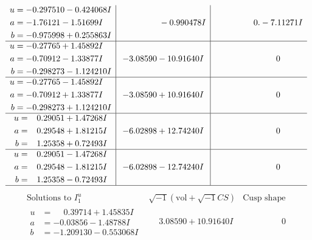 \documentclass[1p]{elsarticle_modified}
\theoremstyle{definition}
\newcommand{\I}{\sqrt{-1}}
\begin{document}
$$\begin{array}{c|c|c}
\begin{aligned}
u &= -0.297510 - 0.424068 I \\
a &= -1.76121 - 1.51699 I \\
b &= -0.975998 + 0.255863 I\end{aligned}
 & \phantom{-0.000000 } -0.990478 I & \phantom{-0.000000 } 0. - 7.11271 I \\ \hline\begin{aligned}
u &= -0.27765 + 1.45892 I \\
a &= -0.70912 - 1.33877 I \\
b &= -0.298273 - 1.124210 I\end{aligned}
 & -3.08590 - 10.91640 I & \phantom{-0.000000 } 0 \\ \hline\begin{aligned}
u &= -0.27765 - 1.45892 I \\
a &= -0.70912 + 1.33877 I \\
b &= -0.298273 + 1.124210 I\end{aligned}
 & -3.08590 + 10.91640 I & \phantom{-0.000000 } 0 \\ \hline\begin{aligned}
u &= \phantom{-}0.29051 + 1.47268 I \\
a &= \phantom{-}0.29548 + 1.81215 I \\
b &= \phantom{-}1.25358 + 0.72493 I\end{aligned}
 & -6.02898 + 12.74240 I & \phantom{-0.000000 } 0 \\ \hline\begin{aligned}
u &= \phantom{-}0.29051 - 1.47268 I \\
a &= \phantom{-}0.29548 - 1.81215 I \\
b &= \phantom{-}1.25358 - 0.72493 I\end{aligned}
 & -6.02898 - 12.74240 I & \phantom{-0.000000 } 0\\
 \hline 
 \end{array}$$\newpage$$\begin{array}{c|c|c}  
\text{Solutions to }I^u_{1}& \I (\text{vol} + \sqrt{-1}CS) & \text{Cusp shape}\\
 \hline 
\begin{aligned}
u &= \phantom{-}0.39714 + 1.45835 I \\
a &= -0.03856 - 1.48788 I \\
b &= -1.209130 - 0.553068 I\end{aligned}
 & \phantom{-}3.08590 + 10.91640 I & \phantom{-0.000000 } 0 \\ \hline\begin{aligned}

\end{aligned}
\end{array}$$
\end{document}
